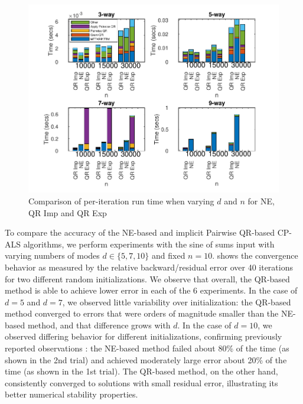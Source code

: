 \documentclass{article}
\begin{document}
\begin{figure}[ht!]
  \begin{center}
    \includegraphics[scale = 1.1]{Fig_kt.pdf}
    \caption[Figure]{Comparison of per-iteration run time when varying $d$ and $n$ for NE, QR Imp and QR Exp \label{fig:runtime}}
  \end{center}
\end{figure}


To compare the accuracy of the NE-based and implicit Pairwise QR-based CP-ALS algorithms, we perform experiments with the sine of sums input with varying numbers of modes $d\in \{5,7,10\}$ and fixed $n=10$.
 shows the convergence behavior as measured by the relative backward/residual error over 40 iterations for two different random initializations.
We observe that overall, the QR-based method is able to achieve lower error in each of the 6 experiments.
In the case of $d=5$ and $d=7$, we observed little variability over initialization: the QR-based method converged to errors that were orders of magnitude smaller than the NE-based method, and that difference grows with $d$.
In the case of $d=10$, we observed differing behavior for different initializations, confirming previously reported observations \cite{MVLB23}: the NE-based method failed about 80\% of the time (as shown in the 2nd trial) and achieved moderately large error about 20\% of the time (as shown in the 1st trial).
The QR-based method, on the other hand, consistently converged to solutions with small residual error, illustrating its better numerical stability properties.
\end{document}
